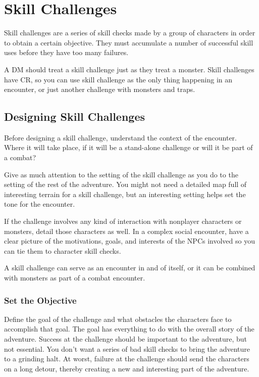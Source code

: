 \section{Skill Challenges}
Skill challenges are a series of skill checks made by a group of characters in order to obtain a certain objective. They must accumulate a number of successful skill uses before they have too many failures.

A DM should treat a skill challenge just as they treat a monster. Skill challenges have CR, so you can use skill challenge as the only thing happening in an encounter, or just another challenge with monsters and traps.


\subsection{Designing Skill Challenges}
Before designing a skill challenge, understand the context of the encounter. Where it will take place, if it will be a stand-alone challenge or will it be part of a combat?

Give as much attention to the setting of the skill challenge as you do to the setting of the rest of the adventure. You might not need a detailed map full of interesting terrain for a skill challenge, but an interesting setting helps set the tone for the encounter.

If the challenge involves any kind of interaction with nonplayer characters or monsters, detail those characters as well. In a complex social encounter, have a clear picture of the motivations, goals, and interests of the NPCs involved so you can tie them to character skill checks.

A skill challenge can serve as an encounter in and of itself, or it can be combined with monsters as part of a combat encounter.

\subsubsection{Set the Objective}
Define the goal of the challenge and what obstacles the characters face to accomplish that goal. The goal has everything to do with the overall story of the adventure. Success at the challenge should be important to the adventure, but not essential. You don't want a series of bad skill checks to bring the adventure to a grinding halt. At worst, failure at the challenge should send the characters on a long detour, thereby creating a new and interesting part of the adventure.

